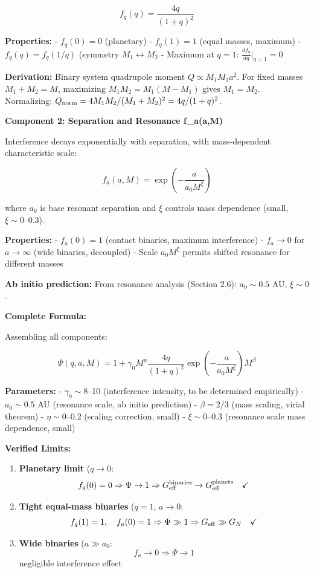 \documentclass[11pt,a4paper]{article}
\begin{document}
\[f_q(q) = \frac{4q}{(1+q)^2}\]

\textbf{Properties:} - \(f_q(0) = 0\) (planetary) - \(f_q(1) = 1\)
(equal masses, maximum) - \(f_q(q) = f_q(1/q)\) (symmetry
\(M_1 \leftrightarrow M_2\) - Maximum at \(q=1\):
\(\frac{df_q}{dq}\Big|_{q=1} = 0\)

\textbf{Derivation:} Binary system quadrupole moment
\(Q \propto M_1 M_2 a^2\). For fixed masses \(M_1+M_2 = M\), maximizing
\(M_1 M_2 = M_1(M-M_1)\) gives \(M_1 = M_2\). Normalizing:
\(Q_{\rm norm} = 4 M_1 M_2/(M_1+M_2)^2 = 4q/(1+q)^2\).

\textbf{Component 2: Separation and Resonance f\_a(a,M)}

Interference decays exponentially with separation, with mass-dependent
characteristic scale:

\[f_a(a,M) = \exp\left(-\frac{a}{a_0 M^\xi}\right)\]

where \(a_0\) is base resonant separation and \(\xi\) controls mass
dependence (small, \(\xi \sim 0\)--0.3).

\textbf{Properties:} - \(f_a(0) = 1\) (contact binaries, maximum
interference) - \(f_a \to 0\) for \(a \to \infty\) (wide binaries,
decoupled) - Scale \(a_0 M^\xi\) permits shifted resonance for different
masses

\textbf{Ab initio prediction:} From resonance analysis (Section 2.6):
\(a_0 \sim 0.5\) AU, \(\xi \sim 0\).

\textbf{Complete Formula:}

Assembling all components:

\[\boxed{\Psi(q,a,M) = 1 + \gamma_0 M^\eta \frac{4q}{(1+q)^2} \exp\left(-\frac{a}{a_0 M^\xi}\right) M^\beta}\]

\textbf{Parameters:} - \(\gamma_0 \sim 8\)--10 (interference intensity,
to be determined empirically) - \(a_0 \sim 0.5\) AU (resonance scale, ab
initio prediction) - \(\beta = 2/3\) (mass scaling, virial theorem) -
\(\eta \sim 0\)--0.2 (scaling correction, small) - \(\xi \sim 0\)--0.3
(resonance scale mass dependence, small)

\textbf{Verified Limits:}

\begin{enumerate}
\def\labelenumi{\arabic{enumi}.}
\item
  \textbf{Planetary limit} (\(q \to 0\):
  \[f_q(0) = 0 \Rightarrow \Psi \to 1 \Rightarrow G_{\rm eff}^{\rm binaries} \to G_{\rm eff}^{\rm planets} \quad \checkmark{}\]
\item
  \textbf{Tight equal-mass binaries} (\(q=1\), \(a \to 0\):
  \[f_q(1) = 1, \quad f_a(0) = 1 \Rightarrow \Psi \gg 1 \Rightarrow G_{\rm eff} \gg G_N \quad \checkmark{}\]
\item
  \textbf{Wide binaries} (\(a \gg a_0\):
  \[f_a \to 0 \Rightarrow \Psi \to 1\] negligible interference effect \checkmark{}
\end{enumerate}
\end{document}
